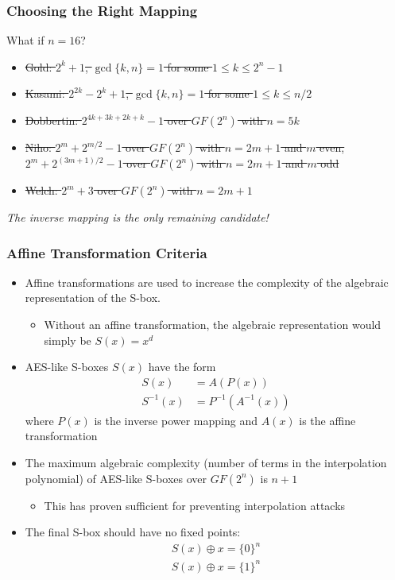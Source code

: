 \documentclass[10pt]{beamer}
\begin{document}
\begin{frame}
	\frametitle{Choosing the Right Mapping}
	What if $n = 16$?
	\begin{itemize}
		\item \sout{Gold: $2^{k} + 1$, $\gcd\{k,n\} = 1$ for some $1 \leq k \leq 2^{n} - 1$}
		\pause
		\item \sout{Kasami: $2^{2k} - 2^k + 1$, $\gcd\{k,n\} = 1$ for some $1 \leq k \leq n/2$}
		\pause
		\item \sout{Dobbertin: $2^{4k + 3k + 2k + k} - 1$ over $GF(2^n)$ with $n = 5k$}
		\pause
		\item \sout{Niho: $2^{m} + 2^{m/2} - 1$ over $GF(2^n)$ with $n = 2m + 1$ and $m$ even, $2^{m} + 2^{(3m + 1)/2} - 1$ over $GF(2^n)$ with $n = 2m + 1$ and $m$ odd}
		\pause
		\item \sout{Welch: $2^m + 3$ over $GF(2^n)$ with $n = 2m + 1$}
	\end{itemize}
	\pause
	\begin{center}
		\emph{The inverse mapping is the only remaining candidate!}
	\end{center}
\end{frame}

\begin{frame}
	\frametitle{Affine Transformation Criteria}
	\begin{itemize}
		\item Affine transformations are used to increase the complexity of the algebraic representation of the S-box.
		\begin{itemize}
			\item Without an affine transformation, the algebraic representation would simply be $S(x) = x^d$
		\end{itemize}
		\pause
		\item AES-like S-boxes $S(x)$ have the form
		\begin{align*}
			S(x) & = A(P(x)) \\
			S^{-1}(x) & = P^{-1}(A^{-1}(x))
		\end{align*}
		where $P(x)$ is the inverse power mapping and $A(x)$ is the affine transformation
		\pause
		\item The maximum algebraic complexity (number of terms in the interpolation polynomial) of AES-like S-boxes over $GF(2^n)$ is $n + 1$
		\begin{itemize}
			\item This has proven sufficient for preventing interpolation attacks
		\end{itemize}
		\pause
		\item The final S-box should have no fixed points:
		\begin{align*}
			S(x) \oplus x = \{0\}^n \\
			S(x) \oplus x = \{1\}^n
		\end{align*}
	\end{itemize}
\end{frame}
\end{document}
